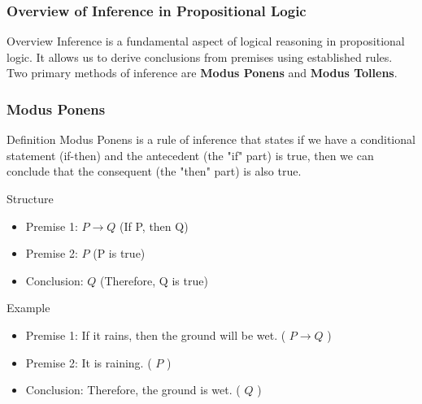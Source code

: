\documentclass[aspectratio=169]{beamer}
\begin{document}
\begin{frame}[fragile]
    \frametitle{Overview of Inference in Propositional Logic}
    \begin{block}{Overview}
        Inference is a fundamental aspect of logical reasoning in propositional logic. It allows us to derive conclusions from premises using established rules. Two primary methods of inference are \textbf{Modus Ponens} and \textbf{Modus Tollens}.
    \end{block}
\end{frame}

\begin{frame}[fragile]
    \frametitle{Modus Ponens}
    \begin{block}{Definition}
        Modus Ponens is a rule of inference that states if we have a conditional statement (if-then) and the antecedent (the "if" part) is true, then we can conclude that the consequent (the "then" part) is also true.
    \end{block}
    \begin{block}{Structure}
        \begin{itemize}
            \item Premise 1: \( P \rightarrow Q \) (If P, then Q)
            \item Premise 2: \( P \) (P is true)
            \item Conclusion: \( Q \) (Therefore, Q is true)
        \end{itemize}
    \end{block}
    \begin{block}{Example}
        \begin{itemize}
            \item Premise 1: If it rains, then the ground will be wet. ( \( P \rightarrow Q \) )
            \item Premise 2: It is raining. ( \( P \) )
            \item Conclusion: Therefore, the ground is wet. ( \( Q \) )
        \end{itemize}
    \end{block}
\end{frame}
\end{document}
